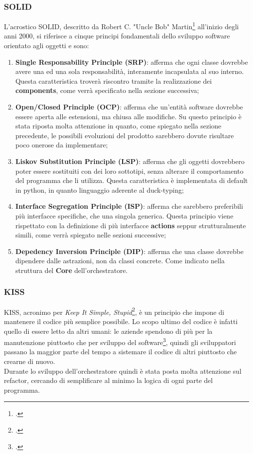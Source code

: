 \subsubsection{SOLID}
L'acrostico SOLID, descritto da Robert C. "Uncle Bob" Martin\footcite{book:designprinciples} all'inizio degli anni 2000, si riferisce a cinque principi fondamentali dello sviluppo software orientato agli oggetti e sono:
\begin{enumerate}
	\item \textbf{Single Responsability Principle (SRP)}: afferma che ogni classe dovrebbe avere una ed una sola responsabilità, interamente incapsulata al suo interno. Questa caratteristica troverà riscontro tramite la realizzazione dei \textbf{components}, come verrà specificato nella sezione successiva;
	\item \textbf{Open/Closed Principle (OCP)}: afferma che un'entità software dovrebbe essere aperta alle estensioni, ma chiusa alle modifiche. Su questo principio è stata riposta molta attenzione in quanto, come spiegato nella sezione precedente, le possibili evoluzioni del prodotto sarebbero dovute risultare poco onerose da implementare;
	\item \textbf{Liskov Substitution Principle (LSP)}: afferma che gli oggetti dovrebbero poter essere sostituiti con dei loro sottotipi, senza alterare il comportamento del programma che li utilizza. Questa caratteristica è implementata di default in python, in quanto linguaggio aderente al \gls{duck-typing};
	\item \textbf{Interface Segregation Principle (ISP)}: afferma che sarebbero preferibili più interfacce specifiche, che una singola generica. Questa principio viene rispettato con la definizione di più interfacce \textbf{actions} seppur strutturalmente simili, come verrà spiegato nelle sezioni successive;
	\item \textbf{Depedency Inversion Principle (DIP)}: afferma che una classe dovrebbe dipendere dalle astrazioni, non da classi concrete. Come indicato nella struttura del \textbf{Core} dell'orchestratore.
\end{enumerate} 
\subsubsection{KISS}
KISS, acronimo per \textit{Keep It Simple, Stupid}\footcite{article:drykiss}, è un principio che impone di mantenere il codice più semplice possibile. Lo scopo ultimo del codice è infatti quello di essere letto da altri umani: le aziende spendono di più per la manutenzione piuttosto che per sviluppo del software\footcite{article:maintenancesurvey}, quindi gli sviluppatori passano la maggior parte del tempo a sistemare il codice di altri piuttosto che crearne di nuovo.\\
Durante lo sviluppo dell'orchestratore quindi è stata posta molta attenzione sul \gls{refactor}, cercando di semplificare al minimo la logica di ogni parte del programma.
